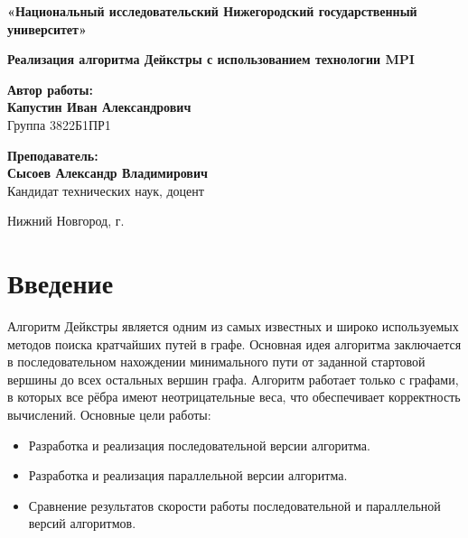 \documentclass[a4paper,14pt]{extarticle}
\begin{document}
\begin{titlepage}
    \begin{center}
        \vspace*{-2cm} %
        {\large \textbf{«Национальный исследовательский Нижегородский государственный университет»}}
        
        \vspace{4cm} %
        {\LARGE \textbf{Реализация алгоритма Дейкстры с использованием технологии MPI}}
        
        \vspace{3cm} %
        \textbf{Автор работы:}\\
        \vspace{0.5cm}
        \textbf{Капустин Иван Александрович}\\
        Группа 3822Б1ПР1
        
        \vspace{1.5cm}
        \textbf{Преподаватель:}\\
        \vspace{0.5cm}
        \textbf{Сысоев Александр Владимирович}\\
        Кандидат технических наук, доцент
        
        \vfill %
        Нижний Новгород, \the\year{} г.
    \end{center}
\end{titlepage}

\section*{Введение}

Алгоритм Дейкстры является одним из самых известных и широко используемых методов поиска кратчайших путей в графе. Основная идея алгоритма заключается в последовательном нахождении минимального пути от заданной стартовой вершины до всех остальных вершин графа. Алгоритм работает только с графами, в которых все рёбра имеют неотрицательные веса, что обеспечивает корректность вычислений.
Основные цели работы:
\begin{itemize}
    \item Разработка и реализация последовательной версии алгоритма.
    \item Разработка и реализация параллельной версии алгоритма.
    \item Сравнение результатов скорости работы последовательной и параллельной версий алгоритмов.
\end{itemize}
\end{document}
